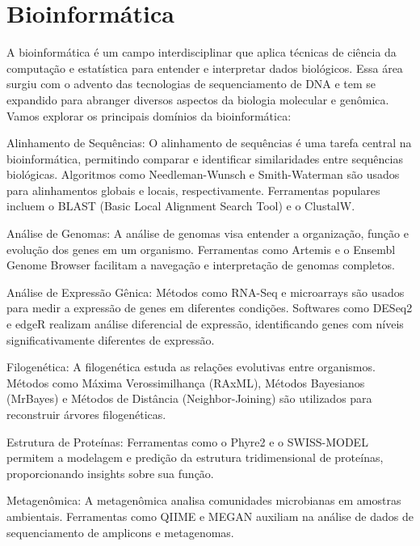 \section{Bioinformática}
A bioinformática é um campo interdisciplinar que aplica técnicas de ciência da computação e estatística para entender e interpretar dados biológicos. Essa área surgiu com o advento das tecnologias de sequenciamento de DNA e tem se expandido para abranger diversos aspectos da biologia molecular e genômica. Vamos explorar os principais domínios da bioinformática:

Alinhamento de Sequências:
O alinhamento de sequências é uma tarefa central na bioinformática, permitindo comparar e identificar similaridades entre sequências biológicas. Algoritmos como Needleman-Wunsch e Smith-Waterman são usados para alinhamentos globais e locais, respectivamente. Ferramentas populares incluem o BLAST (Basic Local Alignment Search Tool) e o ClustalW.

Análise de Genomas:
A análise de genomas visa entender a organização, função e evolução dos genes em um organismo. Ferramentas como Artemis e o Ensembl Genome Browser facilitam a navegação e interpretação de genomas completos.

Análise de Expressão Gênica:
Métodos como RNA-Seq e microarrays são usados para medir a expressão de genes em diferentes condições. Softwares como DESeq2 e edgeR realizam análise diferencial de expressão, identificando genes com níveis significativamente diferentes de expressão.

Filogenética:
A filogenética estuda as relações evolutivas entre organismos. Métodos como Máxima Verossimilhança (RAxML), Métodos Bayesianos (MrBayes) e Métodos de Distância (Neighbor-Joining) são utilizados para reconstruir árvores filogenéticas.

Estrutura de Proteínas:
Ferramentas como o Phyre2 e o SWISS-MODEL permitem a modelagem e predição da estrutura tridimensional de proteínas, proporcionando insights sobre sua função.

Metagenômica:
A metagenômica analisa comunidades microbianas em amostras ambientais. Ferramentas como QIIME e MEGAN auxiliam na análise de dados de sequenciamento de amplicons e metagenomas.

